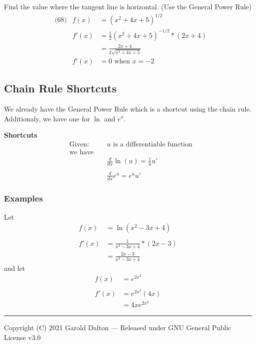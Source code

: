 \documentclass[14pt]{extarticle}
\begin{document}
Find the value where the tangent line is horizontal. (Use the General Power Rule)
\begin{align*}
	&\text{(68)} &f(x) &= (x^2 +4x+5)^{1/2} \\
	&			&f'(x)	&= \frac{1}{2}(x^2 +4x+5)^{-1/2}*(2x +4) \\
	&	&		&= \frac{2x +4}{2 \sqrt{x^2 +4x+5}} \\
	&	&		f'(x)&=0 \text{ when } x=-2
\end{align*} 


\subsection{Chain Rule Shortcuts}
We already have the General Power Rule which is a shortcut using the chain rule. Additionaly, we have one for $\ln$ and $e^x$.

\begin{tcolorbox}[enhanced jigsaw,colback=bg,boxrule=0pt,arc=0pt]
	\textbf{Shortcuts}
	\begin{align*}
		&\text{Given: } & &u \text{ is a differentiable function} \\
		&\text{we have }\\
		& & &\frac{d}{dx}\ln(u) = \frac{1}{u}u' \\\\
		& & &\frac{d}{dx}e^{u} = e^{u}u'
	\end{align*}
\end{tcolorbox}

\subsubsection{Examples}
Let
\begin{align*}
	f(x) &= \ln(x^2 - 3x + 4) \\\\
	f'(x)	&= \frac{1}{x^2-3x+4}*(2x-3) \\
			&= \frac{2x-3}{x^2-3x+4}
\end{align*}
and let
\begin{align*}
	f(x) &= e^{2x^2} \\\\
	f'(x)	&= e^{2x^2}(4x) \\
	&= 4xe^{2x^2}
\end{align*}




\noindent\rule{\textwidth}{1pt}
{\footnotesize Copyright (C) 2021 Garold Dalton --- Released under GNU General Public License v3.0}


\cleardoublepage
\end{document}

